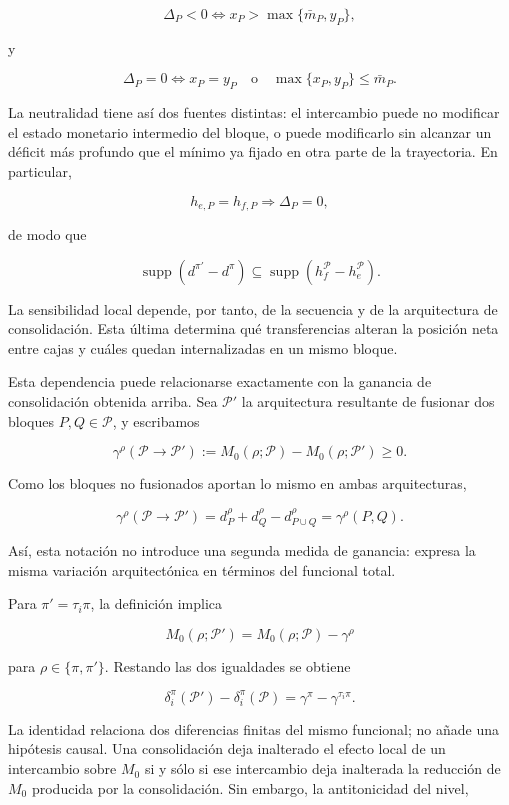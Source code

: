 \documentclass[10pt,a5paper,twoside]{article}
\begin{document}
\[
\Delta_P<0
\iff
x_P>\max\{\bar m_P,y_P\},
\]

y

\[
\Delta_P=0
\iff
x_P=y_P
\quad\text{o}\quad
\max\{x_P,y_P\}\le\bar m_P.
\]

La neutralidad tiene así dos fuentes distintas: el intercambio puede no
modificar el estado monetario intermedio del bloque, o puede modificarlo
sin alcanzar un déficit más profundo que el mínimo ya fijado en otra
parte de la trayectoria. En particular,

\[
h_{e,P}=h_{f,P}
\Longrightarrow
\Delta_P=0,
\]

de modo que

\[
\operatorname{supp}(d^{\pi'}-d^\pi)
\subseteq
\operatorname{supp}(h_f^{\mathcal P}-h_e^{\mathcal P}).
\]

La sensibilidad local depende, por tanto, de la secuencia y de la
arquitectura de consolidación. Esta última determina qué transferencias
alteran la posición neta entre cajas y cuáles quedan internalizadas en un
mismo bloque.

Esta dependencia puede relacionarse exactamente con la ganancia de
consolidación obtenida arriba. Sea \(\mathcal P'\) la arquitectura resultante de
fusionar dos bloques \(P,Q\in\mathcal P\), y escribamos

\[
\gamma^\rho(\mathcal P\to\mathcal P')
:=
M_0(\rho;\mathcal P)-M_0(\rho;\mathcal P')\ge0.
\]

Como los bloques no fusionados aportan lo mismo en ambas arquitecturas,

\[
\gamma^\rho(\mathcal P\to\mathcal P')
=
d_P^\rho+d_Q^\rho-d_{P\cup Q}^\rho
=
\gamma^\rho(P,Q).
\]

Así, esta notación no introduce una segunda medida de ganancia: expresa
la misma variación arquitectónica en términos del funcional total.

Para \(\pi'=\tau_i\pi\), la definición implica

\[
M_0(\rho;\mathcal P')
=
M_0(\rho;\mathcal P)-\gamma^\rho
\]

para \(\rho\in\{\pi,\pi'\}\). Restando las dos igualdades se obtiene

\[
\boxed{
\delta_i^\pi(\mathcal P')-\delta_i^\pi(\mathcal P)
=
\gamma^\pi-\gamma^{\tau_i\pi}.
}
\]

La identidad relaciona dos diferencias finitas del mismo funcional; no
añade una hipótesis causal. Una consolidación deja inalterado el efecto local
de un intercambio sobre \(M_0\) si y sólo si ese intercambio deja inalterada
la reducción de \(M_0\) producida por la consolidación. Sin embargo, la
antitonicidad del nivel,
\end{document}
